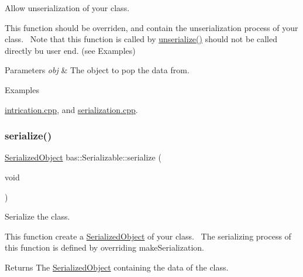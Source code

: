 Allow unserialization of your class. 

This function should be overriden, and contain the unserialization process of your class.~\newline
 Note that this function is called by \mbox{\hyperlink{classbas_1_1Serializable_abd7e38e7a1e5a14b5614ee1c8b4612e0}{unserialize()}} should not be called directly bu user end. (see Examples) 
\begin{DoxyParams}{Parameters}
{\em obj} & The object to pop the data from. \\
\hline
\end{DoxyParams}
\begin{Desc}
\item[Examples]\par
\mbox{\hyperlink{intrication_8cpp-example}{intrication.\+cpp}}, and \mbox{\hyperlink{serialization_8cpp-example}{serialization.\+cpp}}.\end{Desc}
\mbox{\label{classbas_1_1Serializable_a8b05e1e79cc281aa687c12b5786c2af3}} 
\subsubsection{\texorpdfstring{serialize()}{serialize()}}
{\footnotesize\ttfamily \mbox{\hyperlink{classbas_1_1SerializedObject}{Serialized\+Object}} bas\+::\+Serializable\+::serialize (\begin{DoxyParamCaption}\item[{void}]{ }\end{DoxyParamCaption})\hspace{0.3cm}{\ttfamily [inline]}}



Serialize the class. 

This function create a \mbox{\hyperlink{classbas_1_1SerializedObject}{Serialized\+Object}} of your class.~\newline
The serializing process of this function is defined by overriding make\+Serialization. \begin{DoxyReturn}{Returns}
The \mbox{\hyperlink{classbas_1_1SerializedObject}{Serialized\+Object}} containing the data of the class. 
\end{DoxyReturn}
\mbox{\label{classbas_1_1Serializable_abd7e38e7a1e5a14b5614ee1c8b4612e0}} 
